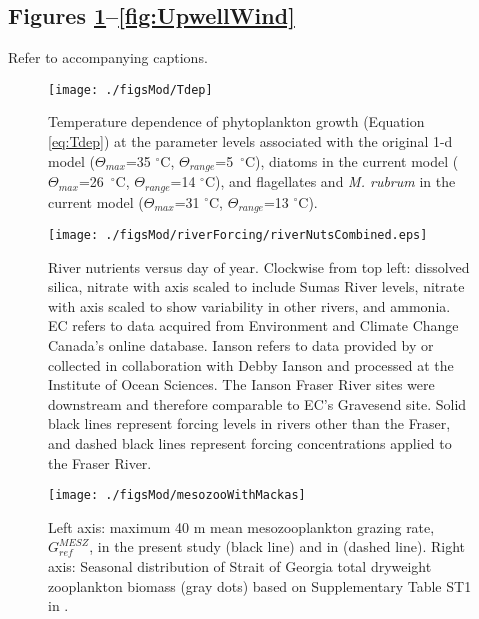 \documentclass[draft,jgrga]{agutexSI2019}
\begin{document}
\begin{article}
\section*{Figures \ref{fig:Tdep}--\ref{fig:UpwellWind}}
Refer to accompanying captions.

\begin{figure}[!ht]
          \centering
          \texttt{[image: ./figsMod/Tdep]}
          \caption{Temperature dependence of phytoplankton growth (Equation \ref{eq:Tdep}) at the parameter levels associated with the original 1-d model ($\Theta_{max}$=35 $^\circ$C, $\Theta_{range}$=5~$^\circ$C), diatoms in the current model ($\Theta_{max}$=26~$^\circ$C, $\Theta_{range}$=14 $^\circ$C), and flagellates and \textit{M. rubrum} in the current model ($\Theta_{max}$=31 $^\circ$C, $\Theta_{range}$=13 $^\circ$C). }
	\label{fig:Tdep}
\end{figure}

\begin{figure}[!ht]
      \centering
      \texttt{[image: ./figsMod/riverForcing/riverNutsCombined.eps]}
      \caption{River nutrients versus day of year. Clockwise from top left: dissolved silica, nitrate with axis scaled to include Sumas River levels, nitrate with axis scaled to show variability in other rivers, and ammonia. EC refers to data acquired from Environment and Climate Change Canada's online database. Ianson refers to data provided by or collected in collaboration with Debby Ianson and processed at the Institute of Ocean Sciences. The Ianson Fraser River sites were downstream and therefore comparable to EC's Gravesend site. Solid black lines represent forcing levels in rivers other than the Fraser, and dashed black lines represent forcing concentrations applied to the Fraser River. }
       \label{fig:rivNuts}
\end{figure}

\begin{figure}[h]
	\centering
          \texttt{[image: ./figsMod/mesozooWithMackas]}
          \caption{Left axis: maximum 40 m mean mesozooplankton grazing rate, $G_{ref}^{MESZ}$,
                    in the present study (black line) and in  (dashed line). 
                    Right axis: Seasonal distribution of Strait of Georgia total dryweight zooplankton biomass (gray dots) based on Supplementary Table ST1 in . }
    \label{fig:mesozoo}
\end{figure}


\end{article}
\end{document}
